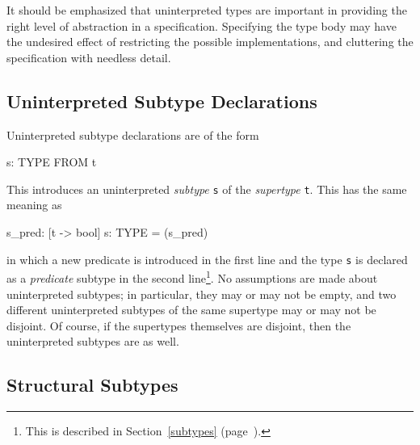 It should be emphasized that uninterpreted types are important in
providing the right level of abstraction in a specification.  Specifying
the type body may have the undesired effect of restricting the possible
implementations, and cluttering the specification with needless detail.



\subsection{Uninterpreted Subtype Declarations}

Uninterpreted subtype declarations are of the form
\begin{pvsex}
  s: TYPE FROM t
\end{pvsex}
This introduces an uninterpreted
\emph{subtype} \texttt{s} of
the \emph{supertype}
\texttt{t}.  This has the same meaning as
\begin{pvsex}
  s_pred: [t -> bool]
  s: TYPE = (s_pred)
\end{pvsex}
%
in which a new predicate is introduced in the first line and the type
\texttt{s} is declared as a \emph{predicate} subtype in the second
line\footnote{This is described in Section~\ref{subtypes}
(page~\pageref{subtypes}).}.  No assumptions are made about uninterpreted
subtypes; in particular, they may or may not be empty, and two different
uninterpreted subtypes of the same supertype may or may not be disjoint.
Of course, if the supertypes themselves are disjoint, then the
uninterpreted subtypes are as well.


\subsection{Structural Subtypes}

